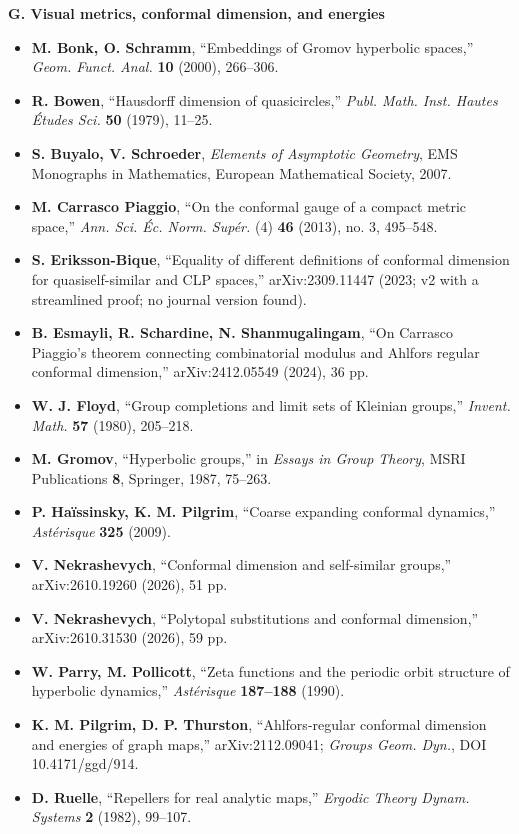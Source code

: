 \documentclass[
]{article}
\providecommand{\tightlist}{%
  \setlength{\itemsep}{0pt}\setlength{\parskip}{0pt}}
\begin{document}
\textbf{G. Visual metrics, conformal dimension, and energies}

\begin{itemize}
\tightlist
\item
  \textbf{M. Bonk, O. Schramm}, ``Embeddings of Gromov hyperbolic
  spaces,'' \emph{Geom. Funct. Anal.} \textbf{10} (2000), 266--306.
\item
  \textbf{R. Bowen}, ``Hausdorff dimension of quasicircles,''
  \emph{Publ. Math. Inst. Hautes \'{E}tudes Sci.} \textbf{50} (1979),
  11--25.
\item
  \textbf{S. Buyalo, V. Schroeder}, \emph{Elements of Asymptotic
  Geometry}, EMS Monographs in Mathematics, European Mathematical
  Society, 2007.
\item
  \textbf{M. Carrasco Piaggio}, ``On the conformal gauge of a compact
  metric space,'' \emph{Ann. Sci. \'{E}c. Norm. Sup\'{e}r.} (4)
  \textbf{46} (2013), no. 3, 495--548.
\item
  \textbf{S. Eriksson-Bique}, ``Equality of different definitions of
  conformal dimension for quasiself-similar and CLP spaces,''
  arXiv:2309.11447 (2023; v2 with a streamlined proof; no journal
  version found).
\item
  \textbf{B. Esmayli, R. Schardine, N. Shanmugalingam}, ``On Carrasco
  Piaggio's theorem connecting combinatorial modulus and Ahlfors regular
  conformal dimension,'' arXiv:2412.05549 (2024), 36 pp.
\item
  \textbf{W. J. Floyd}, ``Group completions and limit sets of Kleinian
  groups,'' \emph{Invent. Math.} \textbf{57} (1980), 205--218.
\item
  \textbf{M. Gromov}, ``Hyperbolic groups,'' in \emph{Essays in Group
  Theory}, MSRI Publications \textbf{8}, Springer, 1987, 75--263.
\item
  \textbf{P. Ha\"{i}ssinsky, K. M. Pilgrim}, ``Coarse expanding
  conformal dynamics,'' \emph{Ast\'{e}risque} \textbf{325} (2009).
\item
  \textbf{V. Nekrashevych}, ``Conformal dimension and self-similar
  groups,'' arXiv:2610.19260 (2026), 51 pp.
\item
  \textbf{V. Nekrashevych}, ``Polytopal substitutions and conformal
  dimension,'' arXiv:2610.31530 (2026), 59 pp.
\item
  \textbf{W. Parry, M. Pollicott}, ``Zeta functions and the periodic
  orbit structure of hyperbolic dynamics,'' \emph{Ast\'{e}risque}
  \textbf{187--188} (1990).
\item
  \textbf{K. M. Pilgrim, D. P. Thurston}, ``Ahlfors-regular conformal
  dimension and energies of graph maps,'' arXiv:2112.09041; \emph{Groups
  Geom. Dyn.}, DOI 10.4171/ggd/914.
\item
  \textbf{D. Ruelle}, ``Repellers for real analytic maps,''
  \emph{Ergodic Theory Dynam. Systems} \textbf{2} (1982), 99--107.
\end{itemize}
\end{document}
